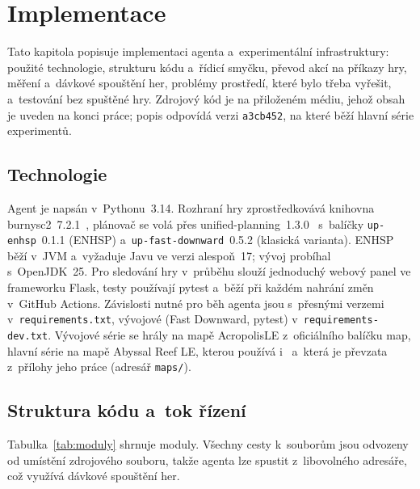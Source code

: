 \chapter{Implementace}
\label{chap:implementace}

Tato kapitola popisuje implementaci agenta a~experimentální infrastruktury: použité technologie, strukturu kódu a~řídicí smyčku, převod akcí na příkazy hry, měření a~dávkové spouštění her, problémy prostředí, které bylo třeba vyřešit, a~testování bez spuštěné hry. Zdrojový kód je na přiloženém médiu, jehož obsah je uveden na konci práce; popis odpovídá verzi \texttt{a3cb452}, na které běží hlavní série experimentů.

\section{Technologie}
\label{sec:technologie}

Agent je napsán v~Pythonu~3.14. Rozhraní hry zprostředkovává knihovna burnysc2~7.2.1~\cite{BurnySc2}, plánovač se volá přes unified-planning~1.3.0~\cite{Micheli2025} s~balíčky \texttt{up-enhsp}~0.1.1 (ENHSP) a~\texttt{up-fast-downward}~0.5.2 (klasická varianta). ENHSP běží v~JVM a~vyžaduje Javu ve verzi alespoň~17; vývoj probíhal s~OpenJDK~25. Pro sledování hry v~průběhu slouží jednoduchý webový panel ve frameworku Flask, testy používají pytest a~běží při každém nahrání změn v~GitHub Actions. Závislosti nutné pro běh agenta jsou s~přesnými verzemi v~\texttt{requirements.txt}, vývojové (Fast Downward, pytest) v~\texttt{requirements-dev.txt}. Vývojové série se hrály na mapě AcropolisLE z~oficiálního balíčku map, hlavní série na mapě Abyssal Reef LE, kterou používá i~\cite{Orava2025} a~která je převzata z~přílohy jeho práce (adresář \texttt{maps/}).

\section{Struktura kódu a~tok řízení}
\label{sec:struktura}

Tabulka~\ref{tab:moduly} shrnuje moduly. Všechny cesty k~souborům jsou odvozeny od umístění zdrojového souboru, takže agenta lze spustit z~libovolného adresáře, což využívá dávkové spouštění her.

